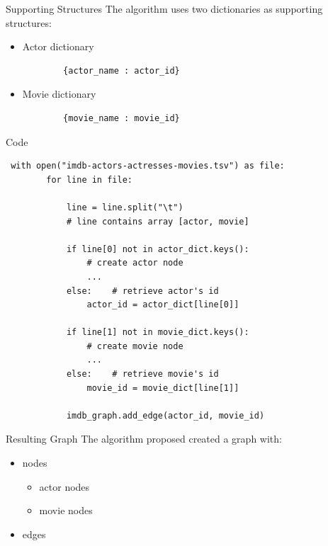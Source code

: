 \begin{frame}[fragile]{Supporting Structures}
The algorithm uses two dictionaries as supporting structures: \\
\begin{itemize}
\pause 
    \item Actor dictionary 
    \begin{verbatim}
        {actor_name : actor_id}
    \end{verbatim}
    \item Movie dictionary
    \begin{verbatim}
        {movie_name : movie_id}
    \end{verbatim}
\end{itemize}
\end{frame}

 \begin{frame}[fragile]{Code}
 \begin{lstlisting}    
 with open("imdb-actors-actresses-movies.tsv") as file:
        for line in file:
            
            line = line.split("\t") 
            # line contains array [actor, movie] 
            
            if line[0] not in actor_dict.keys(): 
                # create actor node
                ...
            else:    # retrieve actor's id
                actor_id = actor_dict[line[0]]

            if line[1] not in movie_dict.keys():  
                # create movie node
                ...
            else:    # retrieve movie's id
                movie_id = movie_dict[line[1]]
                
            imdb_graph.add_edge(actor_id, movie_id)
 \end{lstlisting}
 \end{frame}
 \begin{frame}{Resulting Graph}
 The algorithm proposed created a graph with: \\
 \begin{itemize}
     \item {} nodes \\
     \pause
     \begin{itemize}
         \item {} actor nodes
         \item {} movie nodes
     \end{itemize}
\pause
     \item {} edges
 \end{itemize}
     
 \end{frame}

